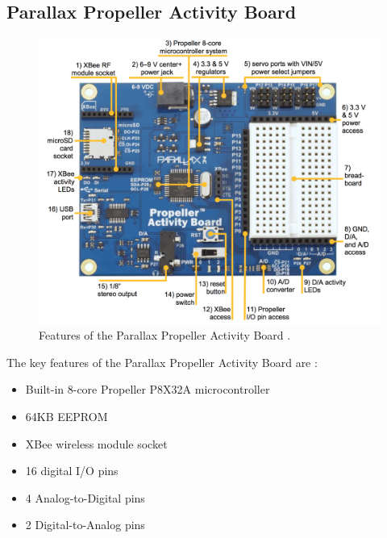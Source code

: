 \documentclass{UoYCSproject}
\begin{document}
\subsection{Parallax Propeller Activity Board}
\begin{figure}[H]
  \includegraphics[width=\linewidth]{graphics/propeller_board.png}
  \caption{Features of the Parallax Propeller Activity Board \parencite{propellerspec}.}
  \label{fig:prop_board}
\end{figure}

The key features of the Parallax Propeller Activity Board are \parencite{propellerspec}:
\begin{itemize}
\item Built-in 8-core Propeller P8X32A microcontroller
\item 64KB EEPROM
\item XBee wireless module socket
\item 16 digital I/O pins
\item 4 Analog-to-Digital pins
\item 2 Digital-to-Analog pins
\end{itemize}
\end{document}
